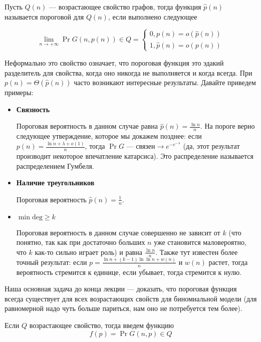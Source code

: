 \begin{definition}
  Пусть $Q(n)$ --- возрастающее свойство графов, тогда функция $\hat{p}(n)$ называется
  пороговой для $Q(n)$, если выполнено следующее

  \[
    \lim\limits_{n \to +\infty} \Pr{G(n, p(n)) \in Q} =
    \begin{cases}
      0, p(n) = o(\hat{p}(n))\\
      1, \hat{p}(n) = o(p(n))
    \end{cases}
  \]
\end{definition}

Неформально это свойство означает, что пороговая функция это эдакий разделитель
для свойства, когда оно никогда не выполняется и когда всегда. При 
$p(n) = \Theta\left(\hat{p}(n)\right)$ часто возникают интересные результаты. Давайте приведем примеры:


\begin{itemize}
  \item \textbf{Связность}

  Пороговая вероятность в данном случае равна $\hat{p}(n) = \frac{\ln n}{n}$.
  На пороге верно следующее утверждение, которое мы докажем позднее: если 
  $p(n) = \frac{\ln n + \lambda + o(1)}{n}$, тогда $\Pr{G \text{ --- связен}} \to
  e^{-e^{-\lambda}}$ (да, этот результат производит некоторое впечатление катарсиса).
  Это распределение называется распределением Гумбеля.

  \item \textbf{Наличие треугольников}

  Пороговая вероятность $\hat{p}(n) = \frac{1}{n}$.

  \item \textbf{$\min \mathrm{deg} \geq k$}

  Пороговая вероятность в данном случае совершенно не зависит от $k$ (что понятно,
  так как при достаточно больших $n$ уже становится маловероятно, что $k$ как-то
  сильно играет роль) и равна $\frac{\ln n}{n}$. Также тут известен более точный
  результат: если $p = \frac{\ln n + (k - 1)\ln\ln n + w(n)}{n}$ и $w(n)$ растет,
  тогда вероятность стремится к единице, если убывает, тогда стремится к нулю.
\end{itemize}

Наша основная задача до конца лекции --- доказать, что пороговая функция
всегда существует для всех возрастающих свойств для биномиальной модели (для
равномерной надо чуть больше париться, нам оно не потребуется тем более).

\begin{definition}
  Если $Q$ возрастающее свойство, тогда введем функцию
  \[
    f(p) = \Pr{G(n, p) \in Q}
  \]
\end{definition}

